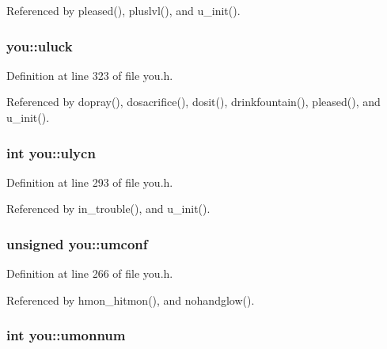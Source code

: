 Referenced by pleased(), pluslvl(), and u\+\_\+init().

\hypertarget{structyou_a89d1a963eea3bc32c00233bc9332f24a}{
\subsubsection[{uluck}]{ you\+::uluck}}\label{structyou_a89d1a963eea3bc32c00233bc9332f24a}


Definition at line 323 of file you.\+h.



Referenced by dopray(), dosacrifice(), dosit(), drinkfountain(), pleased(), and u\+\_\+init().

\hypertarget{structyou_abe1083af83a3184640fcb451791d2722}{
\subsubsection[{ulycn}]{\setlength{\rightskip}{0pt plus 5cm}int you\+::ulycn}}\label{structyou_abe1083af83a3184640fcb451791d2722}


Definition at line 293 of file you.\+h.



Referenced by in\+\_\+trouble(), and u\+\_\+init().

\hypertarget{structyou_ae6400919d6031ac41b98d31ce9906308}{
\subsubsection[{umconf}]{\setlength{\rightskip}{0pt plus 5cm}unsigned you\+::umconf}}\label{structyou_ae6400919d6031ac41b98d31ce9906308}


Definition at line 266 of file you.\+h.



Referenced by hmon\+\_\+hitmon(), and nohandglow().

\hypertarget{structyou_ae0b7ade89d09cd3b6d5e05eb8c859b35}{
\subsubsection[{umonnum}]{\setlength{\rightskip}{0pt plus 5cm}int you\+::umonnum}}\label{structyou_ae0b7ade89d09cd3b6d5e05eb8c859b35}


